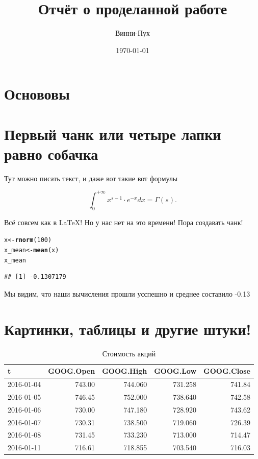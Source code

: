 \documentclass[12pt, a4paper]{article}\usepackage[]{graphicx}\usepackage[]{color}
\title{Отчёт о проделанной работе}
\author{Винни-Пух}
\date{\today}
\makeatletter
\newcommand{\hlnum}[1]{\textcolor[rgb]{0.686,0.059,0.569}{#1}}%
\newcommand{\hlstd}[1]{\textcolor[rgb]{0.345,0.345,0.345}{#1}}%
\newcommand{\hlkwb}[1]{\textcolor[rgb]{0.69,0.353,0.396}{#1}}%
\newcommand{\hlkwd}[1]{\textcolor[rgb]{0.737,0.353,0.396}{\textbf{#1}}}%
\newenvironment{kframe}{%
 \def\at@end@of@kframe{}%
 \ifinner\ifhmode%
  \def\at@end@of@kframe{\end{minipage}}%
  \begin{minipage}{\columnwidth}%
 \fi\fi%
 \def\FrameCommand##1{\hskip\@totalleftmargin \hskip-\fboxsep
 \colorbox{shadecolor}{##1}\hskip-\fboxsep
     \hskip-\linewidth \hskip-\@totalleftmargin \hskip\columnwidth}%
 \MakeFramed {\advance\hsize-\width
   \@totalleftmargin\z@ \linewidth\hsize
   \@setminipage}}%
 {\par\unskip\endMakeFramed%
 \at@end@of@kframe}
\newenvironment{knitrout}{}{} %
\makeatother
\begin{document}
\maketitle

\section{Основовы}




\section{Первый чанк или четыре лапки равно собачка}

Тут можно писать текст, и даже вот такие вот формулы

\[ \int_{0}^{+\infty} x^{s-1} \cdot e^{-x} dx = \Gamma(s). \]

Всё совсем как в \LaTeX! Но у нас нет на это времени! Пора создавать чанк!


\begin{knitrout}
\color{fgcolor}\begin{kframe}
\begin{alltt}
\hlstd{x} \hlkwb{<-} \hlkwd{rnorm}\hlstd{(}\hlnum{100}\hlstd{)}
\hlstd{x_mean} \hlkwb{<-} \hlkwd{mean}\hlstd{(x)}
\hlstd{x_mean}
\end{alltt}
\begin{verbatim}
## [1] -0.1307179
\end{verbatim}
\end{kframe}
\end{knitrout}

Мы видим, что наши вычисления прошли усспешно и среднее составило -0.13



\section{Картинки, таблицы и другие штуки!}




\begin{table}[h!]
\begin{center}

\begin{tabular}{l|r|r|r|r}
\hline
t & GOOG.Open & GOOG.High & GOOG.Low & GOOG.Close\\
\hline
2016-01-04 & 743.00 & 744.060 & 731.258 & 741.84\\
\hline
2016-01-05 & 746.45 & 752.000 & 738.640 & 742.58\\
\hline
2016-01-06 & 730.00 & 747.180 & 728.920 & 743.62\\
\hline
2016-01-07 & 730.31 & 738.500 & 719.060 & 726.39\\
\hline
2016-01-08 & 731.45 & 733.230 & 713.000 & 714.47\\
\hline
2016-01-11 & 716.61 & 718.855 & 703.540 & 716.03\\
\hline
\end{tabular}


\caption{Стоимость акций}
\end{center} 
\end{table}
\end{document}
